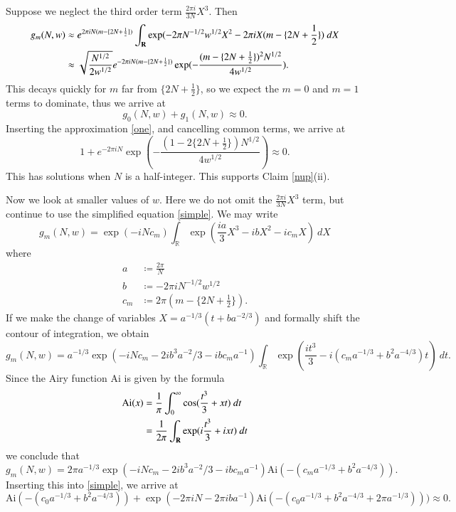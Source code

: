 \documentclass[a4paper,11pt,twoside]{amsart}
\newcommand\R{\mathbb{R}}
\begin{document}
Suppose we neglect the third order term $\frac{2\pi i}{3N} X^3$.  Then 
\begin{align}
 g_m(N,w) &\approx e^{2\pi i N (m - \{2N + \frac{1}{2}\})} \int_{\bf R} \exp( -2\pi N^{-1/2} w^{1/2} X^2 - 2\pi i X (m - \{2N + \frac{1}{2}\})\ dX \nonumber\\
&\approx \sqrt{\frac{N^{1/2}}{2w^{1/2}}} e^{-2\pi i N (m - \{2N + \frac{1}{2}\})} \exp( -\frac{(m - \{2N + \frac{1}{2}\})^2 N^{1/2}}{4w^{1/2}} ).\label{one}
\end{align}
This decays quickly for $m$ far from $\{2N + \frac{1}{2}\}$, so we expect the $m=0$ and $m=1$ terms to dominate, thus we arrive at
\begin{equation}\label{simple}
 g_0(N,w) + g_1(N,w) \approx 0.
\end{equation}
Inserting the approximation \eqref{one}, and cancelling common terms, we arrive at
$$ 
1 + e^{-2\pi i N} \exp( -\frac{( 1 - 2\{2N + \frac{1}{2}\}) N^{1/2}}{4 w^{1/2}} ) \approx 0.$$
This has solutions when $N$ is a half-integer.
This supports Claim \ref{nup}(ii).

Now we look at smaller values of $w$.  Here we do not omit the $\frac{2\pi i}{3N} X^3$ term, but continue to use the simplified equation \eqref{simple}. We may write
$$
g_m(N,w) = \exp(-i N c_m ) \int_\R \exp( \frac{ia}{3} X^3 - i b X^2 - i c_m X )\ dX$$
where
\begin{align*}
a &\coloneqq \frac{2\pi}{N} \\
b &\coloneqq -2 \pi i N^{-1/2} w^{1/2} \\
c_m &\coloneqq 2 \pi (m - \{ 2N + \frac{1}{2} \} ).
\end{align*}
If we make the change of variables $X = a^{-1/3} (t + ba^{-2/3})$ and formally shift the contour of integration, we obtain
$$ g_m(N,w) = a^{-1/3} \exp( -i N c_m - 2 i b^3 a^{-2}/3 - i bc_m a^{-1}) \int_\R \exp( \frac{it^3}{3} - i(c_m a^{-1/3} + b^2 a^{-4/3}) t )\ dt.$$
Since the Airy function $\mathrm{Ai}$ is given by the formula
\begin{align*}
\mathrm{Ai}(x) &= \frac{1}{\pi} \int_0^\infty \cos(\frac{t^3}{3} + xt)\ dt \\
&= \frac{1}{2\pi} \int_{\bf R} \exp(i\frac{t^3}{3} + ixt)\ dt
\end{align*}
we conclude that
$$ g_m(N,w) = 2\pi a^{-1/3} \exp( -i N c_m - 2 i b^3 a^{-2}/3 - i bc_m a^{-1}) \mathrm{Ai}( - (c_m a^{-1/3} + b^2 a^{-4/3}) ).$$
Inserting this into \eqref{simple}, we arrive at
$$ \mathrm{Ai}( - (c_0 a^{-1/3} + b^2 a^{-4/3}) ) + \exp(- 2\pi iN - 2\pi ib a^{-1} ) \mathrm{Ai}( - (c_0 a^{-1/3} + b^2 a^{-4/3} + 2\pi a^{-1/3}) ) ) \approx 0.$$
\end{document}
